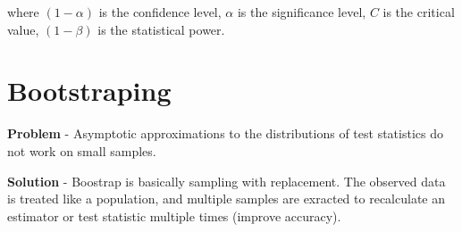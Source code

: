 \documentclass[10pt, a4paper, landscape]{article}
\begin{document}
\begin{multicols}{3}
		where $(1 - \alpha)$ is the confidence level, $\alpha$ is the significance level, $C$ is the critical value, $(1 - \beta)$ is the statistical power.
		
		\section*{Bootstraping}
		
		\textbf{Problem} - Asymptotic approximations to the distributions of test statistics do not work on small samples.
		
		\textbf{Solution} - Boostrap is basically sampling with replacement. The observed data is treated like a population, and multiple samples are exracted to recalculate an estimator or test statistic multiple times (improve accuracy).
	\end{multicols}
	
\end{document}

